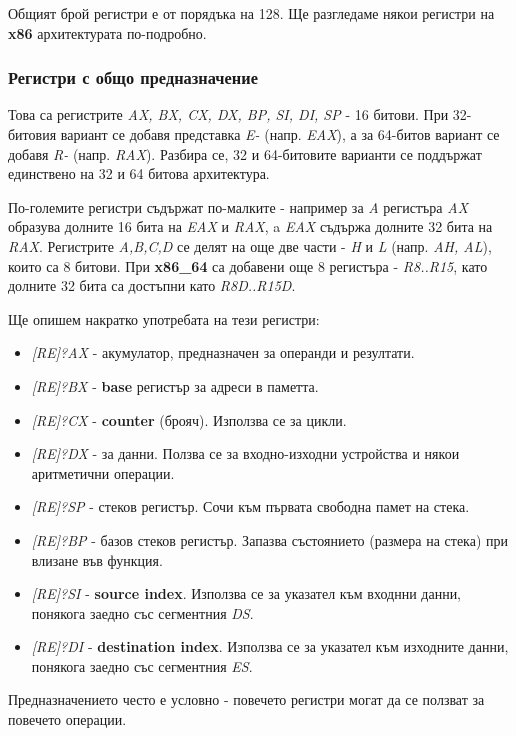 \documentclass[fleqn,12pt]{article}
\begin{document}
Общият брой регистри е от порядъка на 128. Ще разгледаме някои регистри на \textbf{x86} архитектурата по-подробно.

\subsubsection{Регистри с общо предназначение}
Това са регистрите \textit{AX, BX, CX, DX, BP, SI, DI, SP} - 16 битови. При 32-битовия вариант се добавя представка \textit{E-} (напр. \textit{EAX}),
а за 64-битов вариант се добавя \textit{R-} (напр. \textit{RAX}). Разбира се, 32 и 64-битовите варианти се поддържат единствено на 32 и 64 битова архитектура.

По-големите регистри съдържат по-малките - например за \textit{A} регистъра \textit{AX} образува долните 16 бита на \textit{EAX} и \textit{RAX},
a \textit{EAX} съдържа долните 32 бита на \textit{RAX}. 
Регистрите \textit{A,B,C,D} се делят на още две части - \textit{H} и \textit{L} (напр. \textit{AH, AL}), които са 8 битови. 
При \textbf{x86\_64} са добавени още 8 регистъра - \textit{R8..R15}, като долните 32 бита са достъпни като \textit{R8D..R15D}.

Ще опишем накратко употребата на тези регистри:
\begin{itemize}
    \item \textit{[RE]?AX} - акумулатор, предназначен за операнди и резултати.
    \item \textit{[RE]?BX} - \textbf{base} регистър за адреси в паметта.
    \item \textit{[RE]?CX} - \textbf{counter} (брояч). Използва се за цикли.
    \item \textit{[RE]?DX} - за данни. Ползва се за входно-изходни устройства и някои аритметични операции.
    \item \textit{[RE]?SP} - стеков регистър. Сочи към първата свободна памет на стека.
    \item \textit{[RE]?BP} - базов стеков регистър. Запазва състоянието (размера на стека) при влизане във функция.
    \item \textit{[RE]?SI} - \textbf{source index}. Използва се за указател към входнни данни, понякога заедно със сегментния \textit{DS}.
    \item \textit{[RE]?DI} - \textbf{destination index}. Използва се за указател към изходните данни, понякога заедно със сегментния \textit{ES}.
\end{itemize}

Предназначението често е условно - повечето регистри могат да се ползват за повечето операции.
\end{document}
